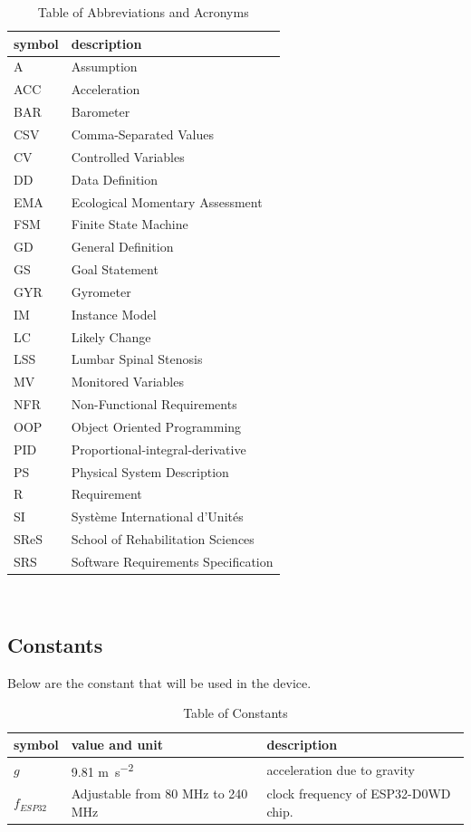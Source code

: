 \documentclass[12pt]{article}
\begin{document}
\renewcommand{\arraystretch}{1.2}
\begin{table}[H]
	\noindent\begin{tabular}{l l} 
	  \toprule		
	  \textbf{symbol} & \textbf{description}\\
	  \midrule 
	  A & Assumption\\
	  ACC & Acceleration\\
	  BAR & Barometer\\
	  CSV & Comma-Separated Values\\
	  CV & Controlled Variables\\
	  DD & Data Definition\\
	  EMA & Ecological Momentary Assessment\\
	  FSM & Finite State Machine\\
	  GD & General Definition\\
	  GS & Goal Statement\\
	  GYR & Gyrometer\\
	  IM & Instance Model\\
	  LC & Likely Change\\
	  LSS & Lumbar Spinal Stenosis\\
	  MV & Monitored Variables\\
	  NFR & Non-Functional Requirements\\
	  OOP & Object Oriented Programming\\
	  PID & Proportional-integral-derivative\\
	  PS & Physical System Description\\
	  R & Requirement\\
	  SI & Syst\`{e}me International d'Unit\'{e}s\\
	  SReS & School of Rehabilitation Sciences\\
	  SRS & Software Requirements Specification\\
	
	  \bottomrule
	\end{tabular}\\
	\caption{\label{abbacr}Table of Abbreviations and Acronyms}  
\end{table}

\subsection{Constants}
Below are the constant that will be used in the device.
\renewcommand{\arraystretch}{1.2}
\begin{table}[H]
	\noindent \begin{longtable*}{l l p{12cm}} \toprule
	
	\textbf{symbol} & \textbf{value and unit} & \textbf{description}\\
	\midrule
	$g$ & 9.81 \si{\metre\per\square\second} & acceleration due to gravity\\
	$f_{ESP32}$ & Adjustable from 80 \si{MHz} to 240 \si{MHz} & clock frequency of ESP32-D0WD chip.\\
	\bottomrule
	\end{longtable*}
	\caption{\label{const}Table of Constants} 
\end{table}
\end{document}
